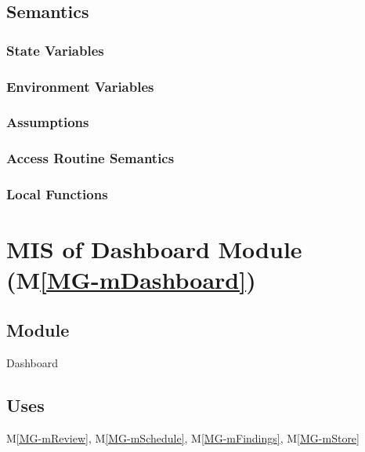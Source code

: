 \documentclass[12pt, titlepage]{article}
\newcommand{\mref}[1]{M\ref{MG-#1}}
\begin{document}
\subsection{Semantics}

\subsubsection{State Variables}


\subsubsection{Environment Variables}


\subsubsection{Assumptions}


\subsubsection{Access Routine Semantics}

\subsubsection{Local Functions}

\newpage

\section{MIS of Dashboard Module (\mref{mDashboard})} \label{mis-mDashboard}

\subsection{Module}
Dashboard

\subsection{Uses}
\mref{mReview}, \mref{mSchedule}, \mref{mFindings}, \mref{mStore}
\end{document}
